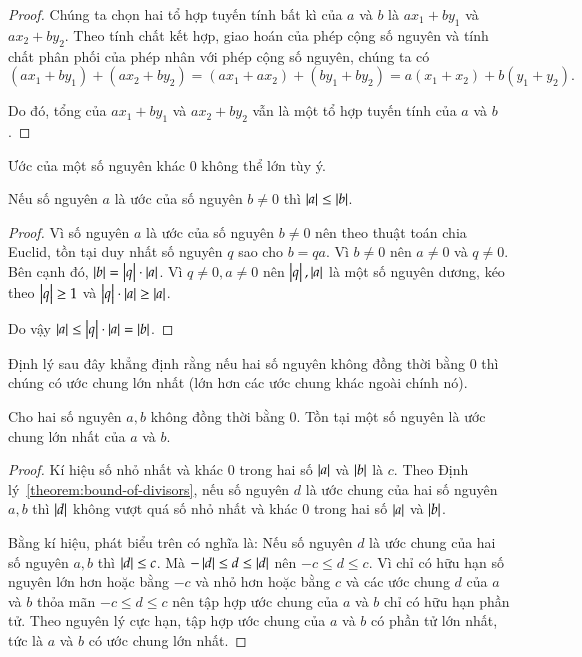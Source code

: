 \begin{proof}
    Chúng ta chọn hai tổ hợp tuyến tính bất kì của $a$ và $b$ là $ax_{1} + by_{1}$ và $ax_{2} + by_{2}$. Theo tính chất kết hợp, giao hoán của phép cộng số nguyên và tính chất phân phối của phép nhân với phép cộng số nguyên, chúng ta có
    \[
        (ax_{1} + by_{1}) + (ax_{2} + by_{2}) = (ax_{1} + ax_{2}) + (by_{1} + by_{2}) = a(x_{1} + x_{2}) + b(y_{1} + y_{2}).
    \]

    Do đó, tổng của $ax_{1} + by_{1}$ và $ax_{2} + by_{2}$ vẫn là một tổ hợp tuyến tính của $a$ và $b$.
\end{proof}

Ước của một số nguyên khác $0$ không thể lớn tùy ý.
\begin{theorem}\label{theorem:bound-of-divisors}
    Nếu số nguyên $a$ là ước của số nguyên $b\ne 0$ thì $\left\vert{a}\right\vert\leq \left\vert{b}\right\vert$.
\end{theorem}

\begin{proof}
    Vì số nguyên $a$ là ước của số nguyên $b\ne 0$ nên theo thuật toán chia Euclid, tồn tại duy nhất số nguyên $q$ sao cho $b = qa$. Vì $b\ne 0$ nên $a\ne 0$ và $q\ne 0$. Bên cạnh đó, $\left\vert{b}\right\vert = \left\vert{q}\right\vert\cdot\left\vert{a}\right\vert$. Vì $q\ne 0, a\ne 0$ nên $\left\vert{q}\right\vert, \left\vert{a}\right\vert$ là một số nguyên dương, kéo theo $\left\vert{q}\right\vert\geq 1$ và $\left\vert{q}\right\vert\cdot\left\vert{a}\right\vert \geq \left\vert{a}\right\vert$.

    Do vậy $\left\vert{a}\right\vert\leq \left\vert{q}\right\vert\cdot\left\vert{a}\right\vert = \left\vert{b}\right\vert$.
\end{proof}

Định lý sau đây khẳng định rằng nếu hai số nguyên không đồng thời bằng $0$ thì chúng có ước chung lớn nhất (lớn hơn các ước chung khác ngoài chính nó).
\begin{theorem}
    Cho hai số nguyên $a, b$ không đồng thời bằng $0$. Tồn tại một số nguyên là ước chung lớn nhất của $a$ và $b$.
\end{theorem}

\begin{proof}
    Kí hiệu số nhỏ nhất và khác $0$ trong hai số $\left\vert{a}\right\vert$ và $\left\vert{b}\right\vert$ là $c$. Theo Định lý~\ref{theorem:bound-of-divisors}, nếu số nguyên $d$ là ước chung của hai số nguyên $a, b$ thì $\left\vert{d}\right\vert$ không vượt quá số nhỏ nhất và khác $0$ trong hai số $\left\vert{a}\right\vert$ và $\left\vert{b}\right\vert$.

    Bằng kí hiệu, phát biểu trên có nghĩa là: Nếu số nguyên $d$ là ước chung của hai số nguyên $a, b$ thì $\left\vert{d}\right\vert\leq c$. Mà $-\left\vert{d}\right\vert\leq d \leq \left\vert{d}\right\vert$ nên $-c\leq d\leq c$. Vì chỉ có hữu hạn số nguyên lớn hơn hoặc bằng $-c$ và nhỏ hơn hoặc bằng $c$ và các ước chung $d$ của $a$ và $b$ thỏa mãn $-c\leq d\leq c$ nên tập hợp ước chung của $a$ và $b$ chỉ có hữu hạn phần tử. Theo nguyên lý cực hạn, tập hợp ước chung của $a$ và $b$ có phần tử lớn nhất, tức là $a$ và $b$ có ước chung lớn nhất.
\end{proof}

